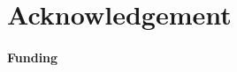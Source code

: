 \documentclass{bioinfo}
\begin{document}
\section*{Acknowledgement}

\paragraph{Funding\textcolon} %


%
%
%
%
%
%
%










\end{document}
